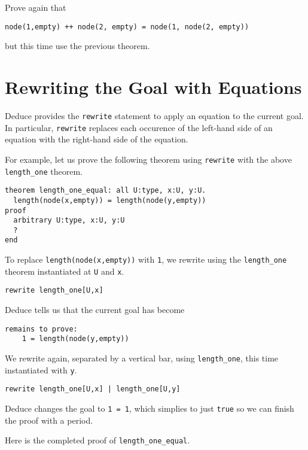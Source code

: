 \documentclass[12pt]{article}
\begin{document}
\noindent Prove again that 
\begin{verbatim}
node(1,empty) ++ node(2, empty) = node(1, node(2, empty))
\end{verbatim}
but this time use the previous theorem.

\pagebreak

\section{Rewriting the Goal with Equations}
\label{sec:rewriting-goal}

Deduce provides the \texttt{rewrite} statement to apply an equation to the
current goal. In particular, \texttt{rewrite} replaces each occurence of the
left-hand side of an equation with the right-hand side of the
equation.

For example, let us prove the following theorem using \texttt{rewrite}
with the above \texttt{length\_one} theorem.

\begin{verbatim}
theorem length_one_equal: all U:type, x:U, y:U.
  length(node(x,empty)) = length(node(y,empty))
proof
  arbitrary U:type, x:U, y:U
  ?
end
\end{verbatim}

To replace \texttt{length(node(x,empty))} with \texttt{1}, we rewrite
using the \texttt{length\_one} theorem instantiated at \texttt{U} and \texttt{x}.

\begin{verbatim}
rewrite length_one[U,x]
\end{verbatim}

\noindent Deduce tells us that the current goal has become

\begin{verbatim}
remains to prove:
	1 = length(node(y,empty))
\end{verbatim}

\noindent We rewrite again, separated by a vertical bar, using
\texttt{length\_one}, this time instantiated with \texttt{y}.

\begin{verbatim}
rewrite length_one[U,x] | length_one[U,y]
\end{verbatim}

\noindent Deduce changes the goal to \texttt{1 = 1}, which simplies to
just \texttt{true} so we can finish the proof with a period.

Here is the completed proof of \texttt{length\_one\_equal}.
\end{document}
